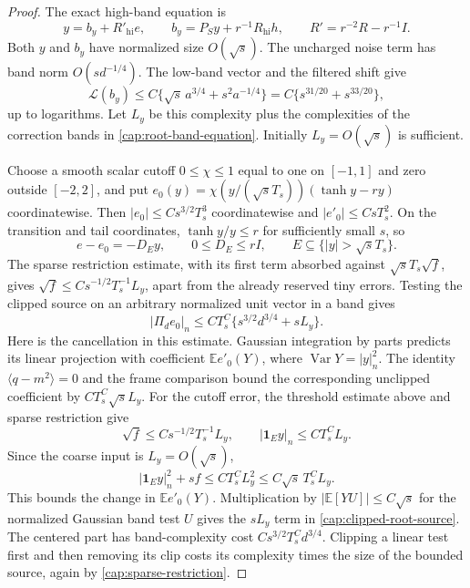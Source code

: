 \begin{proof}
The exact high-band equation is
\begin{equation}\label{cap:root-band-equation}
 y=b_y+R'_{\mathrm{hi}}e,\qquad
 b_y=P_Sy+r^{-1}R_{\mathrm{hi}}h,\qquad
 R'=r^{-2}R-r^{-1}I.
\end{equation}
Both $y$ and $b_y$ have normalized size $O(\sqrt s)$.  The uncharged
noise term has band norm $O(s d^{-1/4})$.  The low-band vector and the
filtered shift give
\begin{equation}\label{cap:base-root-complexity}
 \mathscr L(b_y)
 \le C\{\sqrt s\,a^{3/4}+s^2a^{-1/4}\}
 =C\{s^{31/20}+s^{33/20}\},
\end{equation}
up to logarithms.  Let $L_y$ be this complexity plus the complexities of
the correction bands in \eqref{cap:root-band-equation}.  Initially
$L_y=O(\sqrt s)$ is sufficient.

Choose a smooth scalar cutoff $0\le\chi\le1$ equal to one on $[-1,1]$ and
zero outside $[-2,2]$, and put
$e_0(y)=\chi(y/(\sqrt sT_s))(\tanh y-ry)$ coordinatewise.
Then $|e_0|\le Cs^{3/2}T_s^3$ coordinatewise and $|e'_0|\le CsT_s^2$.
On the transition and tail coordinates, $\tanh y/y\le r$ for sufficiently
small $s$, so
\[
 e-e_0=-D_Ey,\qquad 0\le D_E\le rI,
 \qquad E\subseteq\{|y|>\sqrt sT_s\}.
\]
The sparse restriction estimate, with its first term absorbed against $\sqrt
sT_s\sqrt f$, gives $\sqrt f\le Cs^{-1/2}T_s^{-1}L_y$, apart from the already
reserved tiny errors. Testing the clipped source on an arbitrary normalized
unit vector in a band gives
\begin{equation}\label{cap:clipped-root-source}
 |\Pi_de_0|_n\le CT_s^C
                 \{s^{3/2}d^{3/4}+sL_y\}.
\end{equation}
Here is the cancellation in this estimate. Gaussian integration by parts
predicts its linear projection with coefficient $\mathbb E e'_0(Y)$, where
$\operatorname{Var}Y=|y|_n^2$. The identity $\langle q-m^2\rangle=0$ and the
frame comparison bound the corresponding unclipped coefficient by
\(CT_s^C\sqrt sL_y\). For the cutoff error, the threshold estimate above
and sparse restriction give
\[
 \sqrt f\le Cs^{-1/2}T_s^{-1}L_y,\qquad
 |\mathbf1_Ey|_n\le CT_s^CL_y .
\]
Since the coarse input is \(L_y=O(\sqrt s)\),
\[
 |\mathbf1_Ey|_n^2+sf
 \le CT_s^CL_y^2\le C\sqrt s\,T_s^CL_y .
\]
This bounds the change in \(\mathbb E e'_0(Y)\). Multiplication by
\(|\mathbb E[YU]|\le C\sqrt s\) for the normalized Gaussian band test \(U\)
gives the \(sL_y\) term in
\eqref{cap:clipped-root-source}. The centered part has band-complexity cost
\(Cs^{3/2}T_s^Cd^{3/4}\). Clipping a linear test
first and then removing its clip costs its complexity times the size of the
bounded source, again by \eqref{cap:sparse-restriction}.


\end{proof}
